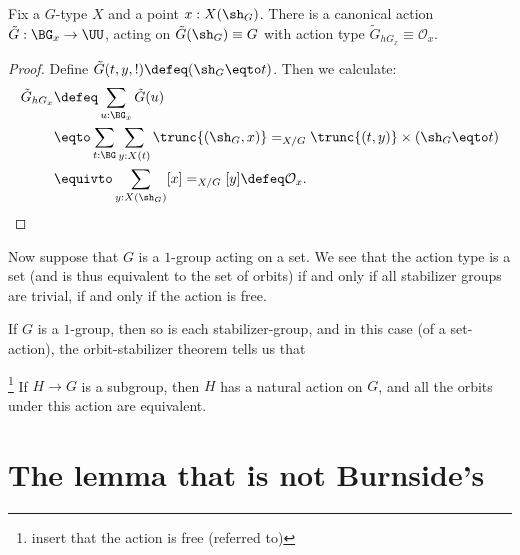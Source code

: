 \begin{theorem}
  \label{old:orbitstab}
  Fix a $G$-type $X$ and a point $x : X(\sh_G)$.
  There is a canonical action $\tilde G : \BG_x \to \UU$,
  acting on $\tilde G(\sh_G)\equiv G$
  with action type $\tilde G_{hG_x} \equiv \mathcal O_x$.
\end{theorem}
\begin{proof}
  Define $\tilde G(t,y,!) \defeq (\sh_G \eqto t)$.
  Then we calculate:
  \begin{align*}
    \tilde G_{hG_x}
    &\defeq \sum_{u : \BG_x}\tilde G(u) \\
    &\eqto \sum_{t:\BG}\sum_{y:X(t)}\trunc{(\sh_G,x)} =_{X/G} \trunc{(t,y)}
      \times (\sh_G \eqto t) \\
    &\equivto \sum_{y:X(\sh_G)}[x] =_{X/G} [y] \defeq \mathcal O_x.\qedhere
  \end{align*}
\end{proof}

Now suppose that $G$ is a $1$-group acting on a set.
We see that the action type is a set
(and is thus equivalent to the set of orbits)
if and only if
all stabilizer groups are trivial,
\ie if and only if the action is free.

If $G$ is a $1$-group,
then so is each stabilizer-group,
and in this case (of a set-action),
the orbit-stabilizer theorem
tells us that

\begin{theorem}\footnote{insert that the action is free (referred to)}
\label{old:lagrange}
  If $H \to G$ is a subgroup, then $H$ has a natural action on $G$,
  and all the orbits under this action are equivalent.
\end{theorem}


\section{The lemma that is not Burnside's}
\label{sec:burnsides-lemma}
\label{lem:burnsides-lemma}

